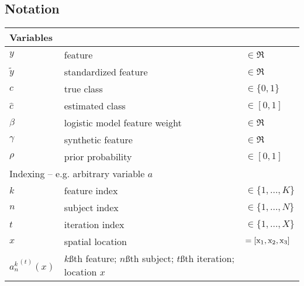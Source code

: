 \begin{singlespacing}
\subsection*{Notation}
\begin{table}[H]
  \begin{tabular}{lll}
  	\hline
  	\multicolumn{3}{l}{Variables}                                                                                            \\ \hline
  	$y$                   & feature                                                                    & $\in\Re$            \\
  	$\tilde{y}$           & standardized feature                                                       & $\in\Re$            \\
  	$c$                   & true class                                                                 & $\in\{0,1\}$        \\
  	$\hat{c}$             & estimated class                                                            & $\in[0,1]$          \\
  	$\beta$               & logistic model feature weight                                              & $\in\Re$            \\
  	$\gamma$              & synthetic feature                                                          & $\in\Re$            \\
  	$\rho$                & prior probability                                                          & $\in[0,1]$          \\ \hline
  	\multicolumn{3}{l}{Indexing -- e.g. arbitrary variable $a$}                                                              \\ \hline
  	$k$                   & feature index                                                              & $\in \{1,\dots,K\}$ \\
  	$n$                   & subject index                                                              & $\in \{1,\dots,N\}$ \\
  	$t$                   & iteration index                                                            & $\in \{1,\dots,X\}$ \\
  	$x$                   & spatial location                                                           & $= [\mathrm{x}_1,\mathrm{x}_2,\mathrm{x}_3]$          \\
  	${a_n^k}^{(t)}(x)$    & $k$\ss{th} feature; $n$\ss{th} subject; $t$\ss{th} iteration; location $x$ &                     \\ \hline

\end{tabular}
\end{table}
\end{singlespacing}
